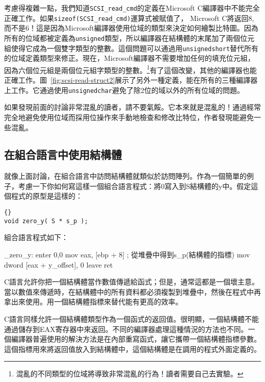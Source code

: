 考慮得複雜一點，我們知道\lstinline|SCSI_read_cmd|的定義在Microsoft
C編譯器中不能完全正確工作。如果\lstinline|sizeof(SCSI_read_cmd)|運算式被賦值了，
Microsoft
C將返回8,而不是6！這是因為Microsoft編譯器使用位域的類型來決定如何繪製比特圖。因為所有的位域都被定義為\lstinline|unsigned|類型，所以編譯器在結構體的末尾加了兩個位元組使得它成為一個雙字類型的整數。這個問題可以通過用\lstinline|unsignedshort|替代所有的位域定義類型來修正。現在，Microsoft編譯器不需要增加任何的填充位元組，因為六個位元組是兩個位元組字類型的整數。\footnote{混亂的不同類型的位域將導致非常混亂的行為！讀者需要自己去實驗。}有了這個改變，其他的編譯器也能正確工作。圖~\ref{fig:scsi-read-struct2}展示了另外一種定義，能在所有的三種編譯器上工作。它通過使用\lstinline|unsignedchar|避免了除2位的域以外的所有位域的問題。

如果發現前面的討論非常混亂的讀者，請不要氣餒。它本來就是混亂的！通過經常完全地避免使用位域而採用位操作來手動地檢查和修改比特位，作者發現能避免一些混亂。



\subsection{在組合語言中使用結構體}

就像上面討論，在組合語言中訪問結構體就類似於訪問陣列。作為一個簡單的例子，考慮一下你如何寫這樣一個組合語言程式：將0寫入到{\code S}結構體的{\code y}中。假定這個程式的原型是這樣的：
\begin{lstlisting}[stepnumber=0]{}
void zero_y( S * s_p );
\end{lstlisting}
\noindent 組合語言程式如下：
\begin{AsmCodeListing}
_zero_y:
      enter  0,0
      mov    eax, [ebp + 8]      ; 從堆疊中得到s_p(結構體的指標)
      mov    dword [eax + y_offset], 0
      leave
      ret
\end{AsmCodeListing}

C語言允許你把一個結構體當作數值傳遞給函式；但是，通常這都是一個壞主意。當以數值來傳遞時，在結構體中的所有資料都必須複製到堆疊中，然後在程式中再拿出來使用。用一個結構體指標來替代能有更高的效率。

C語言同樣允許一個結構體類型作為一個函式的返回值。很明顯，一個結構體不能通過儲存到{\code EAX}寄存器中來返回。不同的編譯器處理這種情況的方法也不同。一個編譯器普遍使用的解決方法是在內部重寫函式，讓它攜帶一個結構體指標參數。這個指標用來將返回值放入到結構體中，這個結構體是在調用的程式外面定義的。

